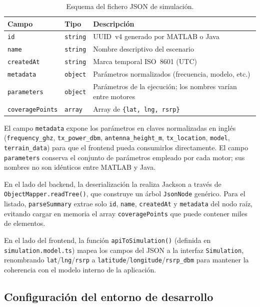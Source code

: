 \begin{table}[H]
\centering
\caption{Esquema del fichero JSON de simulación.}
\label{tab:json_schema}
\begin{tabularx}{\textwidth}{|l|l|X|}
\hline
\textbf{Campo} & \textbf{Tipo} & \textbf{Descripción} \\
\hline
\texttt{id}             & \texttt{string}  & UUID~v4 generado por MATLAB o Java \\
\texttt{name}           & \texttt{string}  & Nombre descriptivo del escenario \\
\texttt{createdAt}      & \texttt{string}  & Marca temporal ISO~8601 (UTC) \\
\texttt{metadata}       & \texttt{object}  & Parámetros normalizados (frecuencia, modelo, etc.) \\
\texttt{parameters}     & \texttt{object}  & Parámetros de la ejecución; los nombres varían entre motores \\
\texttt{coveragePoints} & \texttt{array}   & Array de \texttt{\{lat, lng, rsrp\}} \\
\hline
\end{tabularx}
\end{table}

El campo \texttt{metadata} expone los parámetros en claves normalizadas en inglés
(\texttt{frequency\_ghz}, \texttt{tx\_power\_dbm}, \texttt{antenna\_height\_m},
\texttt{tx\_location}, \texttt{model}, \texttt{terrain\_data}) para que el frontend
pueda consumirlos directamente. El campo \texttt{parameters} conserva el conjunto de
parámetros empleado por cada motor; sus nombres no son idénticos entre MATLAB y Java.

En el lado del backend, la deserialización la realiza Jackson a través de
\texttt{ObjectMapper.readTree()}, que construye un árbol \texttt{JsonNode} genérico.
Para el listado, \texttt{parseSummary} extrae solo \texttt{id}, \texttt{name},
\texttt{createdAt} y \texttt{metadata} del nodo raíz, evitando cargar en memoria el
array \texttt{coveragePoints} que puede contener miles de elementos.

En el lado del frontend, la función \texttt{apiToSimulation()} (definida en
\texttt{simulation.model.ts}) mapea los campos del JSON a la interfaz
\texttt{Simulation}, renombrando \texttt{lat}/\texttt{lng}/\texttt{rsrp} a
\texttt{latitude}/\texttt{longitude}/\texttt{rsrp\_dbm} para mantener la coherencia
con el modelo interno de la aplicación.

\subsection{Configuración del entorno de desarrollo}
\label{sec:integracion_entorno}

